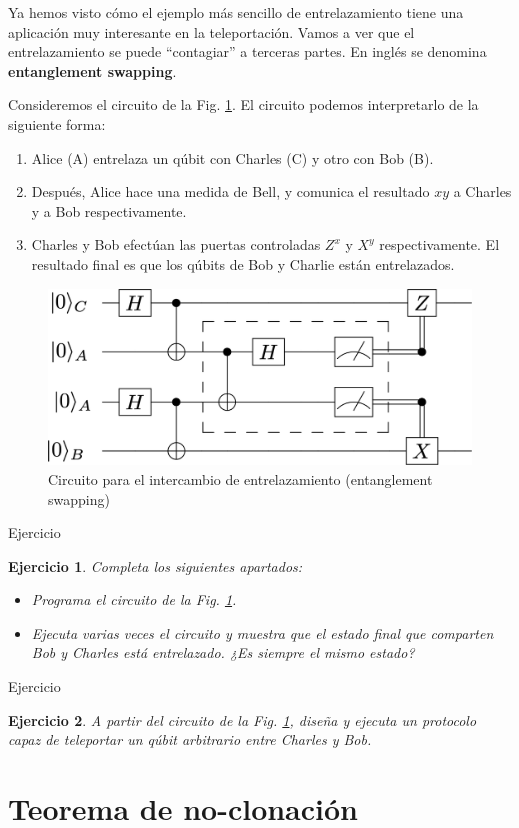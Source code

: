 \documentclass[a4paper,11pt]{book} %
\newtheorem{ejercicio_contador}{Ejercicio}
\newcommand{\Ejercicio}[1]{
		\begin{mybox_gray}{Ejercicio} 
			\begin{ejercicio_contador}
				 #1 
			\end{ejercicio_contador} 
		\end{mybox_gray}
	}
\numberwithin{equation}{chapter}
\begin{document}
Ya hemos visto cómo el ejemplo más sencillo de entrelazamiento tiene una aplicación muy interesante en la teleportación. Vamos a ver que el entrelazamiento se puede ``contagiar'' a terceras partes. En inglés se denomina \textbf{entanglement swapping}.

Consideremos el circuito de la Fig. \ref{Fig_entrelazamiento_entanglement_swap}. El circuito podemos interpretarlo de la siguiente forma:
	\begin{enumerate}
		\item Alice (A) entrelaza un qúbit con Charles (C) y otro con Bob (B).
		
		\item Después, Alice hace una medida de Bell, y comunica el resultado $xy$ a Charles 
		y a Bob respectivamente.
		
		\item Charles y Bob efectúan las puertas controladas $Z^x$ y $X^y$ respectivamente. El resultado final es que los qúbits de Bob y Charlie están entrelazados.
	\end{enumerate}


	\begin{figure}[H]
	\centering 
	\includegraphics[width=0.45\linewidth]{Figuras/Fig_entrelazamiento_entanglement_swap}
	\caption{Circuito para el intercambio de entrelazamiento (entanglement swapping)}
	\label{Fig_entrelazamiento_entanglement_swap}
	\end{figure}


	\Ejercicio{
	Completa los siguientes apartados:
	\begin{itemize}
	\item[a)] Programa el circuito de la Fig. \ref{Fig_entrelazamiento_entanglement_swap}.
	\item[b)] Ejecuta varias veces el circuito y muestra que el estado final que comparten Bob y Charles está entrelazado. ¿Es siempre el mismo estado?
	\end{itemize}
	}
	
	\Ejercicio{
	A partir del circuito de la Fig. \ref{Fig_entrelazamiento_entanglement_swap}, diseña y ejecuta un protocolo capaz de teleportar un qúbit arbitrario entre Charles y Bob.
	}


	\section{Teorema de no-clonación} \label{sec_no_clone}
	
\end{document}

